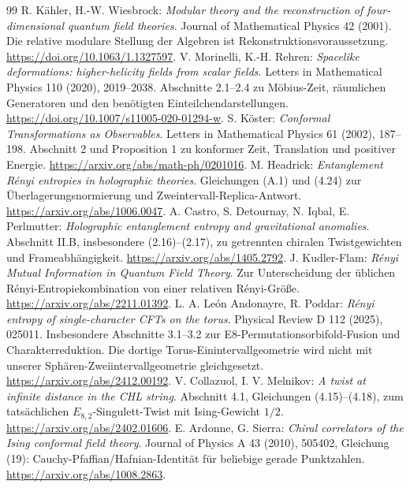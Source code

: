 \begin{thebibliography}{99}
 R. Kähler, H.-W. Wiesbrock: \emph{Modular theory and the reconstruction of four-dimensional quantum field theories}. Journal of Mathematical Physics 42 (2001). Die relative modulare Stellung der Algebren ist Rekonstruktionsvoraussetzung. \url{https://doi.org/10.1063/1.1327597}.
 V. Morinelli, K.-H. Rehren: \emph{Spacelike deformations: higher-helicity fields from scalar fields}. Letters in Mathematical Physics 110 (2020), 2019--2038. Abschnitte 2.1--2.4 zu Möbius-Zeit, räumlichen Generatoren und den benötigten Einteilchendarstellungen. \url{https://doi.org/10.1007/s11005-020-01294-w}.
 S. Köster: \emph{Conformal Transformations as Observables}. Letters in Mathematical Physics 61 (2002), 187--198. Abschnitt 2 und Proposition 1 zu konformer Zeit, Translation und positiver Energie. \url{https://arxiv.org/abs/math-ph/0201016}.
 M. Headrick: \emph{Entanglement Rényi entropies in holographic theories}. Gleichungen (A.1) und (4.24) zur Überlagerungsnormierung und Zweintervall-Replica-Antwort. \url{https://arxiv.org/abs/1006.0047}.
 A. Castro, S. Detournay, N. Iqbal, E. Perlmutter: \emph{Holographic entanglement entropy and gravitational anomalies}. Abschnitt II.B, insbesondere (2.16)--(2.17), zu getrennten chiralen Twistgewichten und Frameabhängigkeit. \url{https://arxiv.org/abs/1405.2792}.
 J. Kudler-Flam: \emph{Rényi Mutual Information in Quantum Field Theory}. Zur Unterscheidung der üblichen Rényi-Entropiekombination von einer relativen Rényi-Größe. \url{https://arxiv.org/abs/2211.01392}.
 L. A. León Andonayre, R. Poddar: \emph{Rényi entropy of single-character CFTs on the torus}. Physical Review D 112 (2025), 025011. Insbesondere Abschnitte 3.1--3.2 zur E8-Permutationsorbifold-Fusion und Charakterreduktion. Die dortige Torus-Einintervallgeometrie wird nicht mit unserer Sphären-Zweiintervallgeometrie gleichgesetzt. \url{https://arxiv.org/abs/2412.00192}.
 V. Collazuol, I. V. Melnikov: \emph{A twist at infinite distance in the CHL string}. Abschnitt 4.1, Gleichungen (4.15)--(4.18), zum tatsächlichen $E_{8,2}$-Singulett-Twist mit Ising-Gewicht $1/2$. \url{https://arxiv.org/abs/2402.01606}.
 E. Ardonne, G. Sierra:
\emph{Chiral correlators of the Ising conformal field theory}.
Journal of Physics A 43 (2010), 505402, Gleichung (19):
Cauchy-Pfaffian/Hafnian-Identität für beliebige gerade Punktzahlen.
\url{https://arxiv.org/abs/1008.2863}.


\end{thebibliography}
